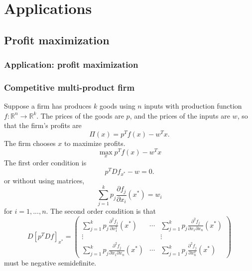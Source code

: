 \documentclass[compress]{beamer}
\def\R{\mathbb{R}}
\renewcommand{\to}{{\rightarrow}}
\begin{document}
\section{Applications}

\subsection{Profit maximization}

\begin{frame}
  \frametitle{Application: profit maximization}
  
\end{frame}

\subsubsection{Competitive multi-product firm}
Suppose a firm has produces $k$ goods using $n$ inputs with production
function $f: \R^n \to \R^k$. The prices of the goods are $p$, and the
prices of the inputs are $w$, so that the firm's profits are 
\[ \Pi(x) =  p^T f(x) -  w^Tx. \]
The firm chooses $x$ to maximize profits.
\[ \max_x p^T f(x) - w^T x \]
The first order condition is
\[ p^T Df_{x^*} - w = 0. \]
or without using matrices,
\[ \sum_{j=1}^k p_j \frac{\partial f_j}{\partial x_i}(x^*) = w_i \]
for $i=1,..., n$. The second order condition is that 
\[ D[p^T Df]_{x^*} = \begin{pmatrix} \sum_{j=1}^k p_j \frac{\partial^2
    f_j}{\partial x_1^2}(x^*) & \cdots & \sum_{j=1}^k p_j \frac{\partial^2
    f_j}{\partial x_1\partial x_n}(x^*)  \\ \vdots & & \vdots \\
  \sum_{j=1}^k p_j \frac{\partial^2
    f_j}{\partial x_1\partial x_n}(x^*) & \cdots & \sum_{j=1}^k p_j
  \frac{\partial^2 f_j}{\partial x_n^2}(x^*) \end{pmatrix} 
\]
must be negative semidefinite. 
\end{document}

